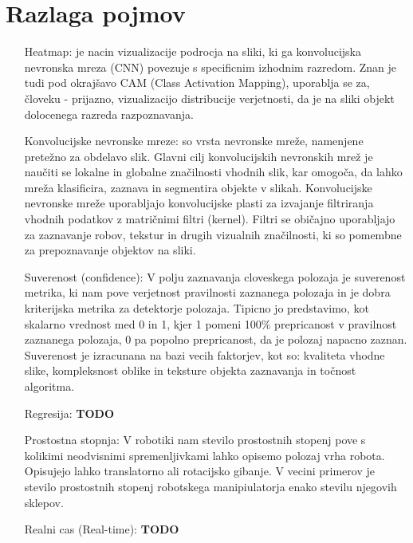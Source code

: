 \documentclass[a4paper,twoside,openright,12pt,slovene]{book}
\begin{document}
\chapter{Razlaga pojmov} \label{razlaga_pojmov}
\begin{itemize}
    \item[Heatmap:] \label{heatmap} je nacin vizualizacije podrocja na sliki, ki ga konvolucijska nevronska mreza (CNN) povezuje s specificnim izhodnim razredom. Znan je tudi pod okrajšavo CAM (Class Activation Mapping), uporablja se za, človeku - prijazno, vizualizacijo distribucije verjetnosti, da je na sliki objekt dolocenega razreda razpoznavanja. \cite{heatmap_website}

    \item[Konvolucijske nevronske mreze:] \label{cnn}so vrsta nevronske mreže, namenjene pretežno za obdelavo slik. Glavni cilj konvolucijskih nevronskih mrež je naučiti se lokalne in globalne značilnosti vhodnih slik, kar omogoča, da lahko mreža klasificira, zaznava in segmentira objekte v slikah. Konvolucijske nevronske mreže uporabljajo konvolucijske plasti za izvajanje filtriranja vhodnih podatkov z matričnimi filtri (kernel). Filtri se običajno uporabljajo za zaznavanje robov, tekstur in drugih vizualnih značilnosti, ki so pomembne za prepoznavanje objektov na sliki. \cite{cnn_clanek}

    \item[Suverenost (confidence):] \label{suverenost} V polju zaznavanja cloveskega polozaja je suverenost metrika, ki nam pove verjetnost pravilnosti zaznanega polozaja in je dobra kriterijska metrika za detektorje polozaja. Tipicno jo predstavimo, kot skalarno vrednost med 0 in 1, kjer 1 pomeni 100\% prepricanost v pravilnost zaznanega polozaja, 0 pa popolno prepricanost, da je polozaj napacno zaznan. Suverenost je izracunana na bazi vecih faktorjev, kot so: kvaliteta vhodne slike, kompleksnost oblike in teksture objekta zaznavanja in točnost algoritma. \cite{confidence_clanek}\cite{confidence_website}

    \item[Regresija:] \textbf{TODO}

    \item[Prostostna stopnja:] \label{DOF}V robotiki nam stevilo prostostnih stopenj pove s kolikimi neodvisnimi spremenljivkami lahko opisemo polozaj vrha robota. Opisujejo lahko translatorno ali rotacijsko gibanje. V vecini primerov je stevilo prostostnih stopenj robotskega manipiulatorja enako stevilu njegovih sklepov. \cite{DOF_website}

    \item[Realni cas (Real-time):] \textbf{TODO}

    
\end{itemize}


\cleardoublepage{} %



\end{document}
